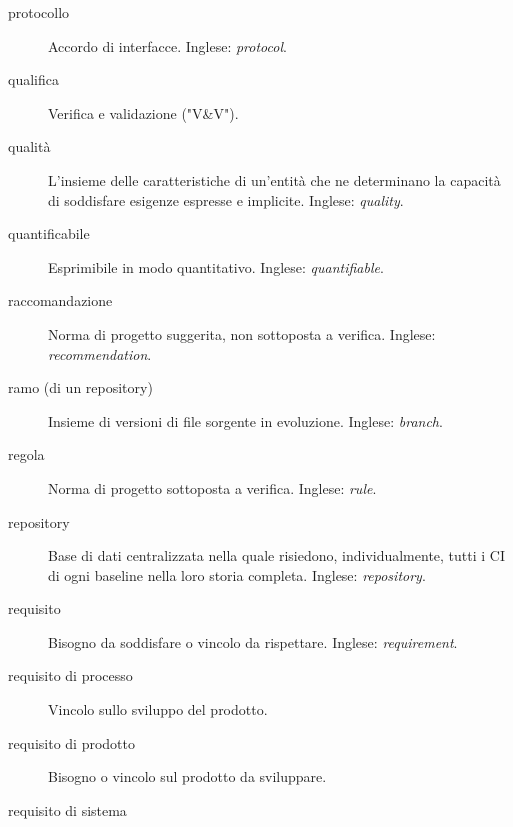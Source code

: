 \documentclass[a4paper]{article}
\begin{document}
\begin{description}
	\item[protocollo] 

			Accordo di interfacce. Inglese: \emph{protocol}.
			
	\item[qualifica] 

			Verifica e validazione ("V\&{}V").
			
	\item[qualità] 

			L'insieme delle caratteristiche di un'entità che ne determinano la capacità di soddisfare esigenze espresse e implicite. Inglese: \emph{quality}.
			
	\item[quantificabile] 

			Esprimibile in modo quantitativo. Inglese: \emph{quantifiable}.
			
	\item[raccomandazione] 

			Norma di progetto suggerita, non sottoposta a verifica. Inglese: \emph{recommendation}.
			
	\item[ramo (di un repository)] 

			Insieme di versioni di file sorgente in evoluzione. Inglese: \emph{branch}.
			
	\item[regola] 

			Norma di progetto sottoposta a verifica. Inglese: \emph{rule}.
			
	\item[repository] 

			Base di dati centralizzata nella quale risiedono, individualmente, tutti i CI di ogni baseline nella loro storia completa. Inglese: \emph{repository}.
			
	\item[requisito] 

			Bisogno da soddisfare o vincolo da rispettare. Inglese: \emph{requirement}.
			
	\item[requisito di processo] 

			Vincolo sullo sviluppo del prodotto.
			
	\item[requisito di prodotto] 

			Bisogno o vincolo sul prodotto da sviluppare.
			
	\item[requisito di sistema] 


\end{description}
\end{document}

